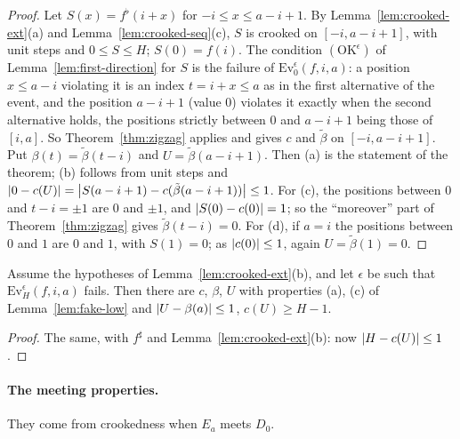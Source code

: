 \begin{proof}
Let $S(x)=f^\flat(i+x)$ for $-i\le x\le a-i+1$. By Lemma~\ref{lem:crooked-ext}(a) and Lemma~\ref{lem:crooked-seq}(c), $S$ is crooked
on $[-i,a-i+1]$, with unit steps and $0\le S\le H$; $S(0)=f(i)$. The condition $(\mathrm{OK}^\epsilon)$ of
Lemma~\ref{lem:first-direction} for $S$ is the failure of $\mathrm{Ev}^\epsilon_0(f,i,a)$: a position $x\le a-i$ violating it is an index
$t=i+x\le a$ as in the first alternative of the event, and the position $a-i+1$ (value $0$) violates it exactly when the second
alternative holds, the positions strictly between $0$ and $a-i+1$ being those of $[i,a]$. So Theorem~\ref{thm:zigzag} applies and
gives $c$ and $\tilde\beta$ on $[-i,a-i+1]$. Put $\beta(t)=\tilde\beta(t-i)$ and $U=\tilde\beta(a-i+1)$. Then (a) is the statement of
the theorem; (b) follows from unit steps and $\left\lvert 0-c(U)\right\rvert=\left\lvert S(a-i+1)-c(\tilde\beta(a-i+1))\right\rvert\le1$. For (c), the positions between $0$
and $t-i=\pm1$ are $0$ and $\pm1$, and $\left\lvert S(0)-c(0)\right\rvert=1$; so the ``moreover'' part of Theorem~\ref{thm:zigzag} gives
$\tilde\beta(t-i)=0$. For (d), if $a=i$ the positions between $0$ and $1$ are $0$ and $1$, with $S(1)=0$; as $\left\lvert c(0)\right\rvert\le1$, again
$U=\tilde\beta(1)=0$.
\end{proof}


\begin{lemma}\label{lem:fake-high}
Assume the hypotheses of Lemma~\ref{lem:crooked-ext}(b), and let $\epsilon$ be such that $\mathrm{Ev}^\epsilon_H(f,i,a)$ fails. Then
there are $c$, $\beta$, $U$ with properties (a), (c) of Lemma~\ref{lem:fake-low} and $\left\lvert U-\beta(a)\right\rvert\le1$, $c(U)\ge H-1$.
\end{lemma}

\begin{proof}
The same, with $f^\sharp$ and Lemma~\ref{lem:crooked-ext}(b): now $\left\lvert H-c(U)\right\rvert\le1$.
\end{proof}


\paragraph{The meeting properties.} They come from crookedness when $E_a$ meets $D_0$.

